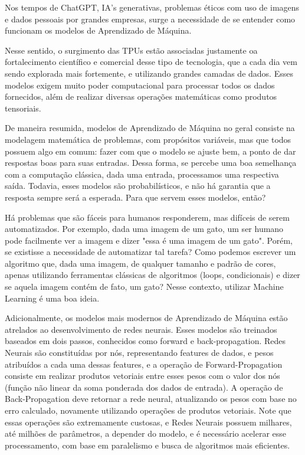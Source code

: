 \documentclass{report}
\begin{document}
Nos tempos de ChatGPT, IA's generativas, problemas éticos com uso de imagens e dados pessoais por grandes empresas, surge a necessidade de se entender como funcionam os modelos de Aprendizado de Máquina. 

Nesse sentido, o surgimento das TPUs estão associadas justamente oa fortalecimento científico e comercial desse tipo de tecnologia, que a cada dia vem sendo explorada mais fortemente, e utilizando grandes camadas de dados. Esses modelos exigem muito poder computacional para processar todos os dados fornecidos, além de realizar diversas operações matemáticas como produtos tensoriais. 

De maneira resumida, modelos de Aprendizado de Máquina no geral consiste na modelagem matemática de problemas, com propósitos variáveis, mas que todos possuem algo em comum: fazer com que o modelo se ajuste bem, a ponto de dar respostas boas para suas entradas. Dessa forma, se percebe uma boa semelhança com a computação clássica, dada uma entrada, processamos uma respectiva saída. Todavia, esses modelos são probabilísticos, e não há garantia que a resposta sempre será a esperada. Para que servem esses modelos, então?

Há problemas que são fáceis para humanos responderem, mas difíceis de serem automatizados. Por exemplo, dada uma imagem de um gato, um ser humano pode facilmente ver a imagem e dizer "essa é uma imagem de um gato". Porém, se existisse a necessidade de automatizar tal tarefa? Como podemos escrever um algoritmo que, dada uma imagem, de qualquer tamanho e padrão de cores, apenas utilizando ferramentas clássicas de algoritmos (loops, condicionais) e dizer se aquela imagem contém de fato, um gato? Nesse contexto, utilizar Machine Learning é uma boa ideia.

Adicionalmente, os modelos mais modernos de Aprendizado de Máquina estão atrelados ao desenvolvimento de redes neurais. Esses modelos são treinados baseados em dois passos, conhecidos como forward e back-propagation. Redes Neurais são constituídas por nós, representando features de dados, e pesos atribuídos a cada uma dessas features, e a operação de Forward-Propagation consiste em realizar produtos vetoriais entre esses pesos com o valor dos nós (função não linear da soma ponderada dos dados de entrada). A operação de Back-Propagation deve retornar a rede neural, atualizando os pesos com base no erro calculado, novamente utilizando operações de produtos vetoriais. Note que essas operações são extremamente custosas, e Redes Neurais possuem milhares, até milhões de parâmetros, a depender do modelo, e é necessário acelerar esse processamento, com base em paralelismo e busca de algoritmos mais eficientes.
\end{document}
